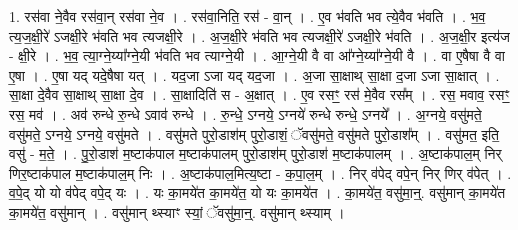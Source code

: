\documentclass[17pt]{extarticle}
\begin{document}
1. रस॑वा ने॒वैव रस॑वा॒न् रस॑वा ने॒व । . रस॑वा॒निति॒ रस॑ - वा॒न् । . ए॒व भ॑वति भव त्ये॒वैव भ॑वति । . भ॒व॒ त्य॒ज॒क्षी॒रे॑ ऽजक्षी॒रे भ॑वति भव त्यजक्षी॒रे । . अ॒ज॒क्षी॒रे भ॑वति भव त्यजक्षी॒रे॑ ऽजक्षी॒रे भ॑वति । . अ॒ज॒क्षी॒र इत्य॑ज - क्षी॒रे । . भ॒व॒ त्या॒ग्ने॒य्या᳚ग्ने॒यी भ॑वति भव त्याग्ने॒यी । . आ॒ग्ने॒यी वै वा आ᳚ग्ने॒य्या᳚ग्ने॒यी वै । . वा ए॒षैषा वै वा ए॒षा । . ए॒षा यद् यदे॒षैषा यत् । . यद॒जा ऽजा यद् यद॒जा । . अ॒जा सा॒क्षाथ् सा॒क्षा द॒जा ऽजा सा॒क्षात् । . सा॒क्षा दे॒वैव सा॒क्षाथ् सा॒क्षा दे॒व । . सा॒क्षादिति॑ स - अ॒क्षात् । . ए॒व रसꣳ॒॒ रस॑ मे॒वैव रस᳚म् । . रस॒ मवाव॒ रसꣳ॒॒ रस॒ मव॑ । . अव॑ रुन्धे रु॒न्धे ऽवाव॑ रुन्धे । . रु॒न्धे॒ ऽग्नये॒ ऽग्नये॑ रुन्धे रुन्धे॒ ऽग्नये᳚ । . अ॒ग्नये॒ वसु॑मते॒ वसु॑मते॒ ऽग्नये॒ ऽग्नये॒ वसु॑मते । . वसु॑मते पुरो॒डाश॑म् पुरो॒डाशं॒ ॅवसु॑मते॒ वसु॑मते पुरो॒डाश᳚म् । . वसु॑मत॒ इति॒ वसु॑ - म॒ते॒ । . पु॒रो॒डाश॑ म॒ष्टाक॑पाल म॒ष्टाक॑पालम् पुरो॒डाश॑म् पुरो॒डाश॑ म॒ष्टाक॑पालम् । . अ॒ष्टाक॑पाल॒म् निर् णिर॒ष्टाक॑पाल म॒ष्टाक॑पाल॒म् निः । . अ॒ष्टाक॑पाल॒मित्य॒ष्टा - क॒पा॒ल॒म् । . निर् व॑पेद् वपे॒न् निर् णिर् व॑पेत् । . व॒पे॒द् यो यो व॑पेद् वपे॒द् यः । . यः का॒मये॑त का॒मये॑त॒ यो यः का॒मये॑त । . का॒मये॑त॒ वसु॑मा॒न्॒. वसु॑मान् का॒मये॑त का॒मये॑त॒ वसु॑मान् । . वसु॑मान् थ्स्याꣳ स्यां॒ ॅवसु॑मा॒न्॒. वसु॑मान् थ्स्याम् । \newline
\end{document}
